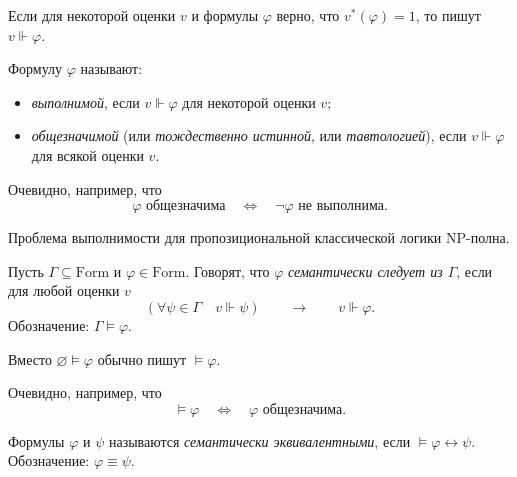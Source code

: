 \documentclass[12pt,a4paper]{article}
\newcommand{\Formul}{\ensuremath{\mathrm{Form}}\xspace}
\newcommand{\NP}{\ensuremath{\mathrm{NP}}\xspace}
\begin{document}
    \begin{definition}
        Если для некоторой оценки $v$ и формулы $\varphi$ верно, что $v^*(\varphi) = 1$, то пишут $v \Vdash \varphi$.
    \end{definition}

    \begin{definition}
        Формулу $\varphi$ называют:
        \begin{itemize}
            \item \emph{выполнимой}, если $v \Vdash \varphi$ для некоторой оценки $v$;
            \item \emph{общезначимой} (или \emph{тождественно истинной}, или \emph{тавтологией}), если $v \Vdash \varphi$ для всякой оценки $v$.
        \end{itemize}
    \end{definition}

    \begin{remark*}
        Очевидно, например, что
        \[\varphi \text{ общезначима}\quad \Longleftrightarrow\quad \neg \varphi \text{ не выполнима}.\]
    \end{remark*}

    \begin{theorem*}
        Проблема выполнимости для пропозициональной классической логики \NP-полна.
    \end{theorem*}

    \begin{definition}
        Пусть $\Gamma \subseteq \Formul$ и $\varphi \in \Formul$. Говорят, что $\varphi$ \emph{семантически следует из $\Gamma$}, если для любой оценки $v$
        \[(\forall \psi \in \Gamma \quad v \Vdash \psi) \qquad \longrightarrow \qquad v \Vdash \varphi.\]
        Обозначение: $\Gamma \vDash \varphi$.

        Вместо $\varnothing \vDash \varphi$ обычно пишут $\vDash \varphi$.
    \end{definition}

    \begin{remark*}
        Очевидно, например, что
        \[\vDash \varphi\quad \Longleftrightarrow\quad \varphi \text{ общезначима}.\]
    \end{remark*}

    \begin{definition}
        Формулы $\varphi$ и $\psi$ называются \emph{семантически эквивалентными}, если $\vDash \varphi \leftrightarrow \psi$. Обозначение: $\varphi \equiv \psi$.
    \end{definition}
\end{document}
